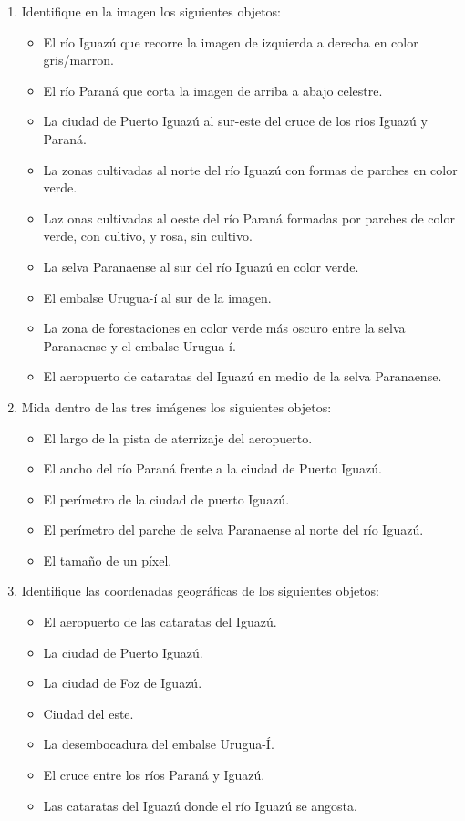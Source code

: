 \begin{enumerate}
  \item Identifique en la imagen los siguientes objetos:
  \begin{itemize}
    \item El río Iguazú que recorre la imagen de izquierda a derecha en color gris/marron.
    \item El río Paraná que corta la imagen de arriba a abajo celestre.
    \item La ciudad de Puerto Iguazú al sur-este del cruce de los rios Iguazú y Paraná.
    \item La zonas cultivadas al norte del río Iguazú con formas de parches en color verde.
    \item Laz onas cultivadas al oeste del río Paraná formadas por parches de color verde, con cultivo, y rosa, sin cultivo.
    \item La selva Paranaense al sur del río Iguazú en color verde.
    \item El embalse Urugua-í al sur de la imagen.
    \item La zona de forestaciones en color verde más oscuro entre la selva Paranaense y el embalse Urugua-í.
    \item El aeropuerto de cataratas del Iguazú en medio de la selva Paranaense.
  \end{itemize}

  \item Mida dentro de las tres imágenes los siguientes objetos:
  \begin{itemize}
    \item El largo de la pista de aterrizaje del aeropuerto.
    \item El ancho del río Paraná frente a la ciudad de Puerto Iguazú.
    \item El perímetro de la ciudad de puerto Iguazú.
    \item El perímetro del parche de selva Paranaense al norte del río Iguazú.
    \item El tamaño de un píxel.
  \end{itemize}

  \item Identifique las coordenadas geográficas de los siguientes objetos:
  \begin{itemize}
    \item El aeropuerto de las cataratas del Iguazú.
    \item La ciudad de Puerto Iguazú.
    \item La ciudad de Foz de Iguazú.
    \item Ciudad del este.
    \item La desembocadura del embalse Urugua-Í.
    \item El cruce entre los ríos Paraná y Iguazú.
    \item Las cataratas del Iguazú donde el río Iguazú se angosta.
  \end{itemize}

\end{enumerate}
